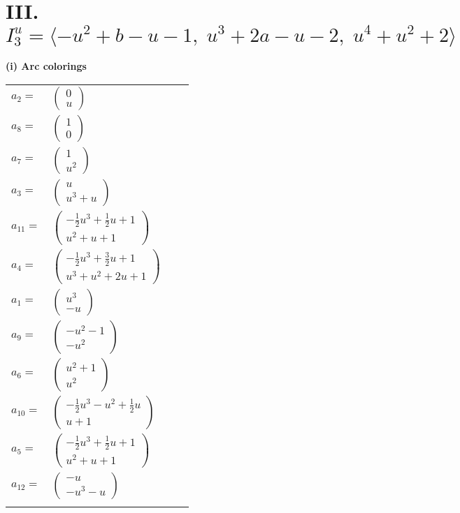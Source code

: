 \documentclass[1p]{elsarticle_modified}
\theoremstyle{definition}
\begin{document}
\centering \section*{III. $I^u_{3}= \langle - u^2+b- u-1,\;u^3+2 a- u-2,\;u^4+u^2+2 \rangle$}
\flushleft \textbf{(i) Arc colorings}\\
\begin{tabular}{m{7pt} m{180pt} m{7pt} m{180pt} }
\flushright $a_{2}=$&$\begin{pmatrix}0\\u\end{pmatrix}$ \\
\flushright $a_{8}=$&$\begin{pmatrix}1\\0\end{pmatrix}$ \\
\flushright $a_{7}=$&$\begin{pmatrix}1\\u^2\end{pmatrix}$ \\
\flushright $a_{3}=$&$\begin{pmatrix}u\\u^3+u\end{pmatrix}$ \\
\flushright $a_{11}=$&$\begin{pmatrix}-\frac{1}{2} u^3+\frac{1}{2} u+1\\u^2+u+1\end{pmatrix}$ \\
\flushright $a_{4}=$&$\begin{pmatrix}-\frac{1}{2} u^3+\frac{3}{2} u+1\\u^3+u^2+2 u+1\end{pmatrix}$ \\
\flushright $a_{1}=$&$\begin{pmatrix}u^3\\- u\end{pmatrix}$ \\
\flushright $a_{9}=$&$\begin{pmatrix}- u^2-1\\- u^2\end{pmatrix}$ \\
\flushright $a_{6}=$&$\begin{pmatrix}u^2+1\\u^2\end{pmatrix}$ \\
\flushright $a_{10}=$&$\begin{pmatrix}-\frac{1}{2} u^3- u^2+\frac{1}{2} u\\u+1\end{pmatrix}$ \\
\flushright $a_{5}=$&$\begin{pmatrix}-\frac{1}{2} u^3+\frac{1}{2} u+1\\u^2+u+1\end{pmatrix}$ \\
\flushright $a_{12}=$&$\begin{pmatrix}- u\\- u^3- u\end{pmatrix}$\\&\end{tabular}
\end{document}
